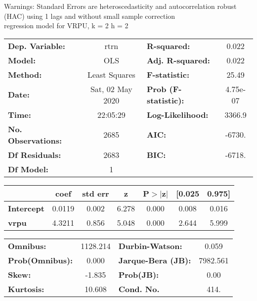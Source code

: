 Warnings: \newline
 [1] Standard Errors are heteroscedasticity and autocorrelation robust (HAC) using 1 lags and without small sample correction\\ 

regression model for VRPU, k = 2 h = 2\begin{center}
\begin{tabular}{lclc}
\toprule
\textbf{Dep. Variable:}    &       rtrn       & \textbf{  R-squared:         } &     0.022   \\
\textbf{Model:}            &       OLS        & \textbf{  Adj. R-squared:    } &     0.022   \\
\textbf{Method:}           &  Least Squares   & \textbf{  F-statistic:       } &     25.49   \\
\textbf{Date:}             & Sat, 02 May 2020 & \textbf{  Prob (F-statistic):} &  4.75e-07   \\
\textbf{Time:}             &     22:05:29     & \textbf{  Log-Likelihood:    } &    3366.9   \\
\textbf{No. Observations:} &        2685      & \textbf{  AIC:               } &    -6730.   \\
\textbf{Df Residuals:}     &        2683      & \textbf{  BIC:               } &    -6718.   \\
\textbf{Df Model:}         &           1      & \textbf{                     } &             \\
\bottomrule
\end{tabular}
\begin{tabular}{lcccccc}
                   & \textbf{coef} & \textbf{std err} & \textbf{z} & \textbf{P$> |$z$|$} & \textbf{[0.025} & \textbf{0.975]}  \\
\midrule
\textbf{Intercept} &       0.0119  &        0.002     &     6.278  &         0.000        &        0.008    &        0.016     \\
\textbf{vrpu}      &       4.3211  &        0.856     &     5.048  &         0.000        &        2.644    &        5.999     \\
\bottomrule
\end{tabular}
\begin{tabular}{lclc}
\textbf{Omnibus:}       & 1128.214 & \textbf{  Durbin-Watson:     } &    0.059  \\
\textbf{Prob(Omnibus):} &   0.000  & \textbf{  Jarque-Bera (JB):  } & 7982.561  \\
\textbf{Skew:}          &  -1.835  & \textbf{  Prob(JB):          } &     0.00  \\
\textbf{Kurtosis:}      &  10.608  & \textbf{  Cond. No.          } &     414.  \\
\bottomrule
\end{tabular}
\end{center}

